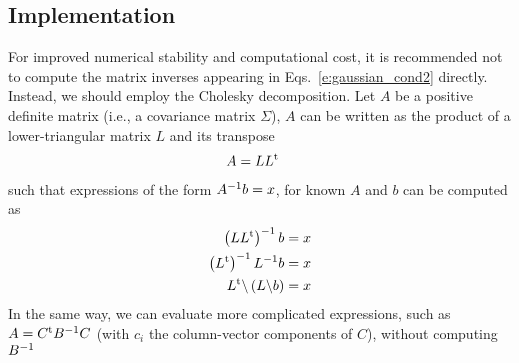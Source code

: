 \documentclass[nobib]{tufte-handout}
\begin{document}
\subsection{Implementation}
For improved numerical stability and computational cost, it is recommended not to compute the matrix inverses appearing in Eqs.~\eqref{e:gaussian_cond2} directly. Instead, we should employ the Cholesky decomposition. Let $A$ be a positive definite matrix (i.e., a covariance matrix $\Sigma$), $A$ can be written as the product of a lower-triangular matrix $L$ and its transpose
\begin{align}
  A &= L L^\textrm{t}\label{e:cholesky}
\end{align}
such that expressions of the form $A^{-1} b = x$, for known $A$ and $b$ can be computed as
\begin{align*}
  \left(L L^\textrm{t}\right)^{-1} b &= x \\
  \left(L^\textrm{t}\right)^{-1} L^{-1} b &= x \\
  L^\textrm{t} \backslash \left(L \backslash b\right) &= x
\end{align*}
In the same way, we can evaluate more complicated expressions, such as $A = C^\textrm{t} B^{-1} C$ (with $c_i$ the column-vector components of $C$), without computing $B^{-1}$
\end{document}
